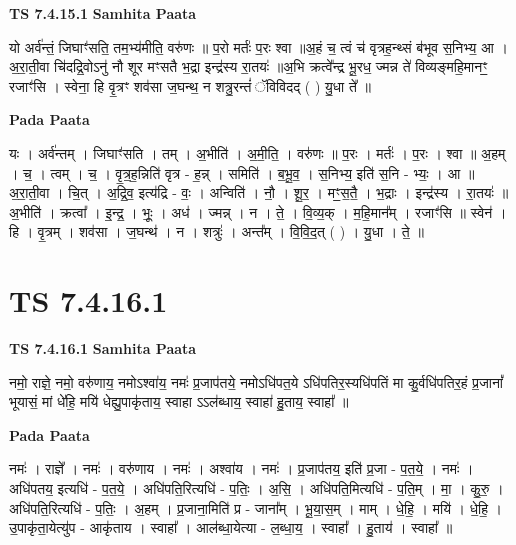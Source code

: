 \documentclass[17pt]{extarticle}
\begin{document}
\textbf{TS 7.4.15.1 } \newline
\textbf{Samhita Paata} \newline

यो अर्व॑न्तं॒ जिघाꣳ॑सति॒ तम॒भ्य॑मीति॒ वरु॑णः ॥ प॒रो मर्तः॑ प॒रः श्वा ॥अ॒हं च॒ त्वं च॑ वृत्रह॒न्थ्सं ब॑भूव स॒निभ्य॒ आ । अ॒रा॒ती॒वा चि॑दद्रि॒वोऽनु॑ नौ शूर मꣳसतै भ॒द्रा इन्द्र॑स्य रा॒तयः॑ ॥अ॒भि क्रत्वे᳚न्द्र भू॒रध॒ ज्मन्न ते॑ विव्यङ्महि॒मानꣳ॒॒ रजाꣳ॑सि । स्वेना॒ हि वृ॒त्रꣳ शव॑सा ज॒घन्थ॒ न शत्रु॒रन्तं॑ ॅविविदद् ( ) यु॒धा ते᳚ ॥ \newline

\textbf{Pada Paata} \newline

यः । अर्व॑न्तम् । जिघाꣳ॑सति । तम् । अ॒भीति॑ । अ॒मी॒ति॒ । वरु॑णः ॥ प॒रः । मर्तः॑ । प॒रः । श्वा ॥ अ॒हम् । च॒ । त्वम् । च॒ । वृ॒त्र॒ह॒न्निति॑ वृत्र - ह॒न्न् । समिति॑ । ब॒भू॒व॒ । स॒निभ्य॒ इति॑ स॒नि - भ्यः॒ । आ ॥ अ॒रा॒ती॒वा । चि॒त् । अ॒द्रि॒व॒ इत्य॑द्रि - वः॒ । अन्विति॑ । नौ॒ । शू॒र॒ । मꣳ॒॒स॒तै॒ । भ॒द्राः । इन्द्र॑स्य । रा॒तयः॑ ॥ अ॒भीति॑ । क्रत्वा᳚ । इ॒न्द्र॒ । भूः॒ । अध॑ । ज्मन्न् । न । ते॒ । वि॒व्य॒क् । म॒हि॒मान᳚म् । रजाꣳ॑सि ॥ स्वेन॑ । हि । वृ॒त्रम् । शव॑सा । ज॒घन्थ॑ । न । शत्रुः॑ । अन्त᳚म् । वि॒वि॒द॒त् ( ) । यु॒धा । ते॒ ॥  \newline





\section{ TS 7.4.16.1 }

\textbf{TS 7.4.16.1 } \newline
\textbf{Samhita Paata} \newline

नमो॒ राज्ञे॒ नमो॒ वरु॑णाय॒ नमोऽश्वा॑य॒ नमः॑ प्र॒जाप॑तये॒ नमोऽधि॑पत॒ये ऽधि॑पतिर॒स्यधि॑पतिं मा कु॒र्वधि॑पतिर॒हं प्र॒जानां᳚ भूयासं॒ मां धे॑हि॒ मयि॑ धेह्यु॒पाकृ॑ताय॒ स्वाहा ऽऽल॑ब्धाय॒ स्वाहा॑ हु॒ताय॒ स्वाहा᳚ ॥ \newline

\textbf{Pada Paata} \newline

नमः॑ । राज्ञे᳚ । नमः॑ । वरु॑णाय । नमः॑ । अश्वा॑य । नमः॑ । प्र॒जाप॑तय॒ इति॑ प्र॒जा - प॒त॒ये॒ । नमः॑ । अधि॑पतय॒ इत्यधि॑ - प॒त॒ये॒ । अधि॑पति॒रित्यधि॑ - प॒तिः॒ । अ॒सि॒ । अधि॑पति॒मित्यधि॑ - प॒ति॒म् । मा॒ । कु॒रु॒ । अधि॑पति॒रित्यधि॑ - प॒तिः॒ । अ॒हम् । प्र॒जाना॒मिति॑ प्र - जाना᳚म् । भू॒या॒स॒म् । माम् । धे॒हि॒ । मयि॑ । धे॒हि॒ । उ॒पाकृ॑ता॒येत्यु॑प - आकृ॑ताय । स्वाहा᳚ । आल॑ब्धा॒येत्या - ल॒ब्धा॒य॒ । स्वाहा᳚ । हु॒ताय॑ । स्वाहा᳚ ॥  \newline
\end{document}
